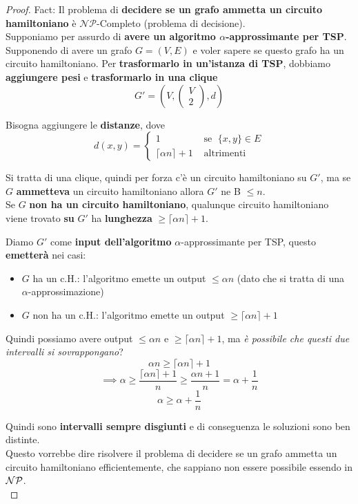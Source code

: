 \begin{proof}
	Fact: Il problema di \textbf{decidere se un grafo ammetta un circuito hamiltoniano} è $\mathcal{NP}$-Completo (problema di decisione).\\
	
	Supponiamo per assurdo di \textbf{avere un algoritmo $\alpha$-approssimante per TSP}. \\
	
	Supponendo di avere un grafo $G=(V,E)$ e voler sapere se questo grafo ha un circuito hamiltoniano. Per \textbf{trasformarlo in un'istanza di TSP}, dobbiamo \textbf{aggiungere pesi} e \textbf{trasformarlo in una clique}
	$$ G' = \left(V, \left(
	\begin{array}{c}
		V\\
		2
	\end{array}
	\right), d \right)$$
	
	Bisogna aggiungere le \textbf{distanze}, dove
	$$ 
	d(x,y) = \begin{cases}
		1 & \text{ se } \; \{x,y\} \in E \\
		\lceil \alpha n \rceil + 1 & \text{ altrimenti}
	\end{cases}
	$$
	
	Si tratta di una clique, quindi per forza c'è un circuito hamiltoniano su $G'$, ma se $G$ \textbf{ammetteva} un circuito hamiltoniano allora $G'$ ne B $\leq n$.\\
	Se $G$ \textbf{non ha un circuito hamiltoniano}, qualunque circuito hamiltoniano viene trovato \textbf{su} $G'$ ha \textbf{lunghezza} $\geq \lceil \alpha n\rceil + 1$.\\
	
	\newpage
	
	Diamo $G'$ come \textbf{input dell'algoritmo} $\alpha$-approssimante per TSP, questo \textbf{emetterà} nei casi:
	\begin{itemize}
		\item $G$ ha un c.H.: l'algoritmo emette un output $\leq \alpha n$ (dato che si tratta di una $\alpha$-approssimazione)
		\item $G$ non ha un c.H.: l'algoritmo emette un output $\geq \lceil \alpha n \rceil + 1$
	\end{itemize}
	
	Quindi possiamo avere output $\leq \alpha n$ e  $\geq \lceil \alpha n \rceil + 1$, ma \textit{è possibile che questi due intervalli si sovrappongano}?
	$$ \alpha n \geq \lceil \alpha n \rceil + 1 $$
	$$ \implies \alpha \geq \frac{\lceil \alpha n \rceil + 1}{n} \geq \frac{\alpha n + 1}{n} = \alpha + \frac{1}{n}$$
	$$ \alpha \geq \alpha + \frac{1}{n}$$
	
	Quindi sono \textbf{intervalli sempre disgiunti} e di conseguenza le soluzioni sono ben distinte.\\
	
	Questo vorrebbe dire risolvere il problema di decidere se un grafo ammetta un circuito hamiltoniano efficientemente, che sappiano non essere possibile essendo in $\mathcal{NP}$.\\
\end{proof}

